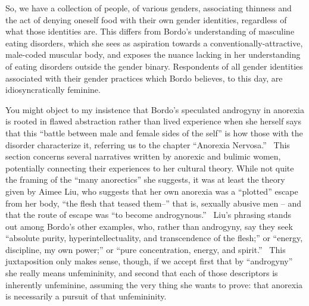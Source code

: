 \documentclass[11pt]{article}
\begin{document}
    So, we have a collection of people, of various genders, associating thinness and the act of denying oneself food with their own gender identities, regardless of what those identities are. This differs from Bordo's understanding of masculine eating disorders, which she sees as aspiration towards a conventionally-attractive, male-coded muscular body, and exposes the nuance lacking in her understanding of eating disorders outside the gender binary. Respondents of all gender identities associated with their gender practices which Bordo believes, to this day, are idiosyncratically feminine. 

    You might object to my insistence that Bordo's speculated androgyny in anorexia is rooted in flawed abstraction rather than lived experience when she herself says that this ``battle between male and female sides of the self'' is how those with the disorder characterize it, referring us to the chapter ``Anorexia Nervosa.''~\autocite[174]{Bordo03} This section concerns several narratives written by anorexic and bulimic women, potentially connecting their experiences to her cultural theory. While not quite the framing of the ``many anorectics'' she suggests, it was at least the theory given by Aimee Liu, who suggests that her own anorexia was a ``plotted'' escape from her body, ``the flesh that teased them--'' that is, sexually abusive men -- and that the route of escape was ``to become androgynous.''~\autocite[As it happens, Liu's memoir was reprinted in 2013 with an additional preface, in which she reflects on her conceptions as a twenty-five-year-old: ``Unfortunately, our society's emphasis on appearance has intensified in the intervening decades, and the academic and emotional pressures on adolescents have only escalated. At the same time, scientific research has shown that eating disorders are much more complex conditions than I realized when I was writing about my own experience. Genes play a large role in determining who is vulnerable to anorexia and bulimia, and who is not. So do brain chemistry and biological temperament -- personality.'' In a simple and, I felt, touching way, she ends the preface with: ``For me and virtually every other person I've ever met who's suffered from an eating disorder, that problem involves identity. Who am I in the world? Why don't I know who I am? Why am I forced to be someone different than who I am? Why do I feel so wrong? Why can't others see that I feel empty inside?'']{Liu13} Liu's phrasing stands out among Bordo's other examples, who, rather than androgyny, say they seek ``absolute purity, hyperintellectuality, and transcendence of the flesh;'' or ``energy, discipline, my own power;'' or ``pure concentration, energy, and spirit.''~\autocite[150]{Bordo03} This juxtaposition only makes sense, though, if we accept first that by ``androgyny'' she really means unfemininity, and second that each of those descriptors is inherently unfeminine, assuming the very thing she wants to prove: that anorexia is necessarily a pursuit of that unfemininity. 
\end{document}
